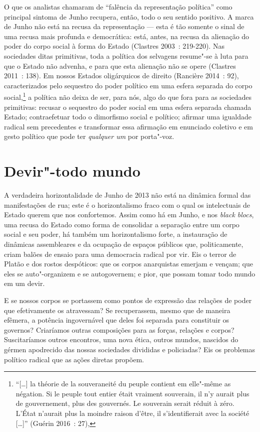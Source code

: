O que os analistas chamaram de ``falência da representação política''
como principal sintoma de Junho recupera, então, todo o seu sentido
positivo. A marca de Junho não está na recusa da representação --- esta é
tão somente o sinal de uma recusa mais profunda e democrática: está,
antes, na recusa da alienação do poder do corpo social à forma do Estado
(Clastres 2003~: 219-220). Nas sociedades ditas primitivas, toda a
política dos selvagens resume"-se à luta para que o Estado não advenha, e
para que esta alienação não se opere (Clastres 2011~: 138). Em nossos
Estados oligárquicos de direito (Rancière 2014~: 92), caracterizados
pelo sequestro do poder político em uma esfera separada do corpo
social,\footnote{``{[}\ldots{}{]} la théorie de la souveraneité du peuple
  contient em elle"-même as négation. Si le peuple tout entier était
  vraiment souverain, il n'y aurait plus de gouvernement, plus des
  gouvernés. Le souverain serait réduit à zéro. L'État n'aurait plus la
  moindre raison d'être, il s'identifierait avec la société {[}\ldots{}{]}''
  (Guérin 2016~: 27),} a política não deixa de ser, para nós, algo do
que fora para as sociedades primitivas: recusar o sequestro do poder
social em uma esfera separada chamada Estado; contraefetuar todo o
dimorfismo social e político; afirmar uma igualdade radical sem
precedentes e transformar essa afirmação em enunciado coletivo e em
gesto político que pode ter \emph{qualquer um} por porta"-voz.

\section{Devir"-todo mundo}

A verdadeira horizontalidade de Junho de
2013 não está na dinâmica formal das manifestações de rua; este é o
horizontalismo fraco com o qual os intelectuais de Estado querem que nos
confortemos. Assim como há em Junho, e nos \emph{black blocs}, uma
recusa do Estado como forma de consolidar a separação entre um corpo
social e seu poder, há também um horizontalismo forte, a instauração de
dinâmicas assembleares e da ocupação de espaços públicos que,
politicamente, criam balões de ensaio para uma democracia radical por
vir. Eis o terror de Platão e dos rostos despóticos: que os corpos
anarquistas emerjam e vençam; que eles se auto"-organizem e se
autogovernem; e pior, que possam tomar todo mundo em um devir.

E se nossos corpos se portassem como pontos de expressão das relações de
poder que efetivamente os atravessam? Se recuperassem, mesmo que de
maneira efêmera, a potência ingovernável que deles foi separada para
constituir os governos? Criaríamos outras composições para as forças,
relações e corpos? Suscitaríamos outros encontros, uma nova ética,
outros mundos, nascidos do gérmen apodrecido das nossas sociedades
divididas e policiadas? Eis os problemas político radical que as ações
diretas propõem.

